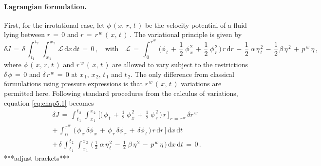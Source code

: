 \documentclass[alpha-refs, 12pt]{wiley-article}
\begin{document}
\paragraph{Lagrangian formulation.} First, for the irrotational case, let $\phi\,(x,\,r,\,t\,)$ be the velocity potential of a fluid lying between $r\,=\,0$ and $r\,=\,r^{\,w}\,(\,x,\,t\,)\,$. The variational principle \citep{Luke1967} is given by
\begin{equation}\label{eq:chap5.1}
  \delta J\,=\,\delta\,\int_{\,t_{1}}^{\,t_{2}}\,\int_{\,x_{\,1}}^{\,x_{\,2}}\,\mathcal{L}\,\mathrm{d}x\,\mathrm{d}t\,=\,0\,,\quad \text{with} \quad \mathcal{L}\,=\,\int_{\,0}^{\,r^{\,w}}\,\biggl(\phi_{\,t} \,+\,\frac{1}{2}\;\phi_{\,x}^{\,2} \,+\,\frac{1}{2}\;\phi_{\,r}^{\,2}\,\biggr)\,r\,\mathrm{d}r\,-\,\frac{1}{2}\;\alpha\,\eta_{\,t}^{\,2} \,-\,\frac{1}{2}\,\beta\,\eta^{\,2}\,+\,p^{\,w}\,\eta\,,
\end{equation}
where $\phi\,(\,x,\,r,\,t\,)$ and $r^{\,w}\,(\,x,\,t\,)$ are allowed to vary subject to the restrictions $\delta\,\phi\,=\,0$ and $\delta \,r^{\,w}\,=\,0$ at $x_{\,1},\,x_{\,2},\,t_{\,1}$ and $t_{\,2}$. The only difference from classical formulations using pressure expressions is that $r^{\,w}\,(\,x,\,t\,)$ variations are permitted here. Following standard procedures from the calculus of variations, equation \eqref{eq:chap5.1} becomes
\begin{multline}
  \delta J\,=\,\int_{\,t_{\,1}}^{\,t_{\,2}}\,\int_{\,x_{\,1}}^{\,x_{\,2}}\,\Biggl[\biggl(\,\phi_{\,t}\,+\,\frac{1}{2}\;\phi_{\,x}^{\,2}\,+\,\frac{1}{2}\;\phi_{\,r}^{\,2}\,\biggr)\,r\,\Biggr]_{\,r\,=\,r^{\,w}}\,\delta r^{\,w}
  \\[0.5em]
  +\,\int_{\,0}^{\,r^{\,w}}\,\bigl(\,\phi_{\,x}\,\delta \phi_{\,x}\,+\,\phi_{\,r}\,\delta \phi_{\,r}\,+\,\delta \phi_{\,t}\,\bigr)\,r\,\mathrm{d}r\,\Biggr]\,\mathrm{d}x\,\mathrm{d}t
  \\[0.5em]
  +\,\delta\,\int_{\,t_{\,1}}^{\,t_{\,2}}\,\int_{\,x_{\,1}}^{\,x_{\,2}}\,\biggl(\,\frac{1}{2}\;\alpha\,\eta_{\,t}^{\,2} \,-\,\frac{1}{2}\;\beta\,\eta^{\,2} \,-\,p^{\,w}\,\eta\,\biggr)\,\mathrm{d}x\,\mathrm{d}t\,=\,0\,.
\end{multline}
{\color{red}***adjust brackets***}
\end{document}
